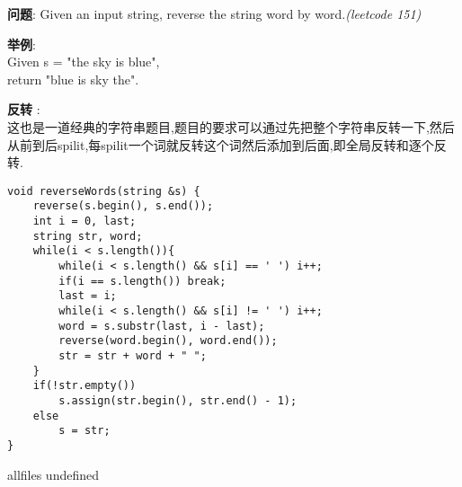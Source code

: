 \documentclass{article}
\begin{document}
\begin{CJK}{UTF8}{gbsn}     %

\else
    
\begin{description}
    \item{\textbf{问题}}: Given an input string, reverse the string word by word.\textit{(leetcode 151)}
	\item{\textbf{举例}}:\\
	Given s = "the sky is blue",\\
	return "blue is sky the". 
    \item{\textbf{反转}} : 
    \\这也是一道经典的字符串题目,题目的要求可以通过先把整个字符串反转一下,然后从前到后spilit,每spilit一个词就反转这个词然后添加到后面,即全局反转和逐个反转.
    \begin{lstlisting}
void reverseWords(string &s) {
	reverse(s.begin(), s.end());
	int i = 0, last;
	string str, word;
	while(i < s.length()){
		while(i < s.length() && s[i] == ' ') i++;
		if(i == s.length()) break;
		last = i;
		while(i < s.length() && s[i] != ' ') i++;
		word = s.substr(last, i - last);
		reverse(word.begin(), word.end());
		str = str + word + " ";
	}
	if(!str.empty())
		s.assign(str.begin(), str.end() - 1);
	else
		s = str;
}
    \end{lstlisting}
\end{description}

\fi

\ifx allfiles undefined
\end{CJK}
\end{document}
